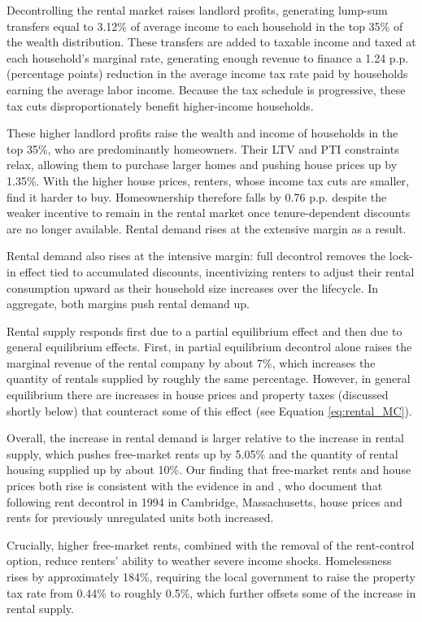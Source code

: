 \documentclass[parskip=full]{article}
\begin{document}
Decontrolling the rental market raises landlord profits, generating lump-sum transfers equal to 3.12\% of average income to each household in the top 35\% of the wealth distribution. These transfers are added to taxable income and taxed at each household's marginal rate, generating enough revenue to finance a 1.24 p.p. (percentage points) reduction in the average income tax rate paid by households earning the average labor income. Because the tax schedule is progressive, these tax cuts disproportionately benefit higher-income households.

These higher landlord profits raise the wealth and income of households in the top 35\%, who are predominantly homeowners. Their LTV and PTI constraints relax, allowing them to purchase larger homes and pushing house prices up by 1.35\%. With the higher house prices, renters, whose income tax cuts are smaller, find it harder to buy. Homeownership therefore falls by 0.76 p.p. despite the weaker incentive to remain in the rental market once tenure-dependent discounts are no longer available. Rental demand rises at the extensive margin as a result.

Rental demand also rises at the intensive margin: full decontrol removes the lock-in effect tied to accumulated discounts, incentivizing renters to adjust their rental consumption upward as their household size increases over the lifecycle. In aggregate, both margins push rental demand up. 

Rental supply responds first due to a partial equilibrium effect and then due to general equilibrium effects. First, in partial equilibrium decontrol alone raises the marginal revenue of the rental company by about 7\%, which increases the quantity of rentals supplied by roughly the same percentage. However, in general equilibrium there are increases in house prices and property taxes (discussed shortly below) that counteract some of this effect (see Equation \eqref{eq:rental_MC}). 

Overall, the increase in rental demand is larger relative to the increase in rental supply, which pushes free-market rents up by 5.05\% and the quantity of rental housing supplied up by about 10\%. Our finding that free-market rents and house prices both rise is consistent with the evidence in \citet{sims-2007} and \citet{app-2014}, who document that following rent decontrol in 1994 in Cambridge, Massachusetts, house prices and rents for previously unregulated units both increased.

Crucially, higher free-market rents, combined with the removal of the rent-control option, reduce renters' ability to weather severe income shocks. Homelessness rises by approximately 184\%, requiring the local government to raise the property tax rate from 0.44\% to roughly 0.5\%, which further offsets some of the increase in rental supply.
\end{document}
